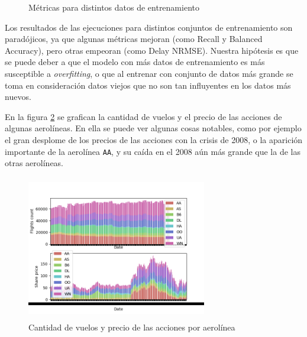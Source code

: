 \begin{figure}
\begin{center}
\end{center}
\caption{M\'etricas para distintos datos de entrenamiento}
\label{table:metrics}
\end{figure}

Los resultados de las ejecuciones para distintos conjuntos de entrenamiento son parad\'ojicos, ya
que algunas m\'etricas mejoran (como Recall y Balanced Accuracy), pero otras empeoran
(como Delay NRMSE). Nuestra hip\'otesis es que se puede deber a que el modelo con m\'as datos
de entrenamiento es m\'as susceptible a \textit{overfitting}, o que al entrenar con conjunto de datos
m\'as grande se toma en consideraci\'on datos viejos que no son tan influyentes en los datos m\'as nuevos.

En la figura \ref{fig:flights_and_stock_prices} se grafican la cantidad de vuelos y el precio de las acciones
de algunas aerol\'ineas. En ella se puede ver algunas cosas notables, como por ejemplo el gran desplome
de los precios de las acciones con la crisis de 2008, o la aparici\'on importante de la aerol\'inea \texttt{AA},
y su ca\'ida en el 2008 a\'un m\'as grande que la de las otras aerol\'ineas.

\begin{figure}[hbtp]
  \centering
  \includegraphics[width=0.7\textwidth, height=2.5in]{plots/flights_and_stock_prices.png}
  \caption{Cantidad de vuelos y precio de las acciones por aerol\'inea}
  \label{fig:flights_and_stock_prices}
\end{figure}

